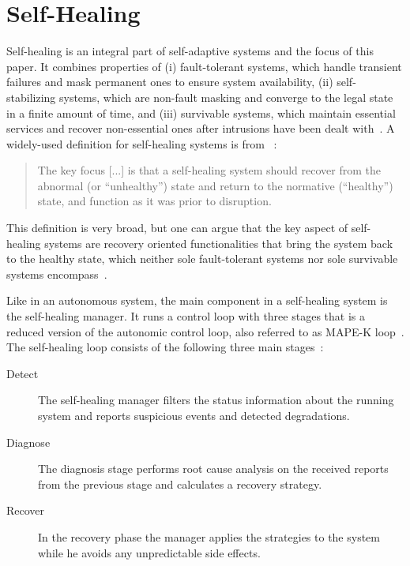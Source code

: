 
\section{Self-Healing}\label{sec:self-healing}
  Self-healing is an integral part of self-adaptive systems and the focus of this paper.
  It combines properties of
  (i) fault-tolerant systems, which handle transient failures and mask permanent ones to ensure system availability,
  (ii) self-stabilizing systems, which are non-fault masking and converge to the legal state in a finite amount of time, and 
  (iii) survivable systems, which maintain essential services and recover non-essential ones after intrusions have been dealt with~\cite{PsaierSurvey}.
  A widely-used definition for self-healing systems is from \citeauthor{Ghosh}~\cite{Ghosh}:

  \begin{quote}
    The key focus [...] is that a self-healing system should recover from the abnormal (or \enquote{unhealthy}) state and return to the normative (\enquote{healthy}) state, and function as it was prior to disruption.
  \end{quote}

  This definition is very broad, but one can argue that the key aspect of self-healing systems are recovery oriented functionalities that bring the system back to the healthy state, which neither sole fault-tolerant systems nor sole survivable systems encompass~\cite{PsaierSurvey}.

  Like in an autonomous system, the main component in a self-healing system is the self-healing manager.
  It runs a control loop with three stages that is a reduced version of the autonomic control loop, also referred to as MAPE-K loop~\cite{ibm_autonomic}.
  The self-healing loop consists of the following three main stages~\cite{PsaierSurvey}:

  \begin{description}
    \item[Detect] The self-healing manager filters the status information about the running system and reports suspicious events and detected degradations.
    \item[Diagnose] The diagnosis stage performs root cause analysis on the received reports from the previous stage and calculates a recovery strategy.
    \item[Recover] In the recovery phase the manager applies the strategies to the system while he avoids any unpredictable side effects.
  \end{description}

